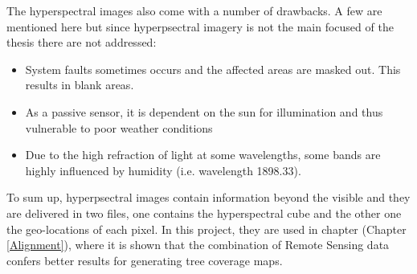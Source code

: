 \documentclass{subfiles}
\begin{document}
	The hyperspectral images also come with a number of drawbacks. A few are mentioned here but since hyperpsectral imagery is not the main focused of the thesis there are not addressed:
	\begin{itemize}
		\item System faults sometimes occurs and the affected areas are masked out. This results in blank areas. 
		\item As a passive sensor, it is dependent on the sun for illumination and thus vulnerable to poor weather conditions
		\item Due to the high refraction of light at some wavelengths, some bands are highly influenced by humidity (i.e. wavelength 1898.33).
	\end{itemize}
	
	To sum up, hyperpsectral images contain information beyond the visible and they are delivered in two files, one contains the hyperspectral cube and the other one the geo-locations of each pixel. In this project, they are used in chapter (Chapter \ref{Alignment}), where it is shown that the combination of Remote Sensing data confers better results for generating tree coverage maps. 
	
	
	
	
\end{document}
